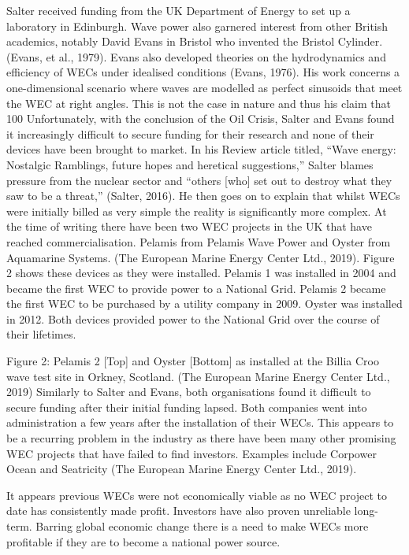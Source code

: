 \documentclass{report}
\begin{document}
Salter received funding from the UK Department of Energy to set up a laboratory in Edinburgh. Wave power also garnered interest from other British academics, notably David Evans in Bristol who invented the Bristol Cylinder. (Evans, et al., 1979).
Evans also developed theories on the hydrodynamics and efficiency of WECs under idealised conditions (Evans, 1976). His work concerns a one-dimensional scenario where waves are modelled as perfect sinusoids that meet the WEC at right angles. This is not the case in nature and thus his claim that 100%
Unfortunately, with the conclusion of the Oil Crisis, Salter and Evans found it increasingly difficult to secure funding for their research and none of their devices have been brought to market. In his Review article titled, “Wave energy: Nostalgic Ramblings, future hopes and heretical suggestions,” Salter blames pressure from the nuclear sector and “others [who] set out to destroy what they saw to be a threat,” (Salter, 2016). He then goes on to explain that whilst WECs were initially billed as very simple the reality is significantly more complex.
At the time of writing there have been two WEC projects in the UK that have reached commercialisation. Pelamis from Pelamis Wave Power and Oyster from Aquamarine Systems. (The European Marine Energy Center Ltd., 2019). Figure 2 shows these devices as they were installed. Pelamis 1 was installed in 2004 and became the first WEC to provide power to a National Grid. Pelamis 2 became the first WEC to be purchased by a utility company in 2009. Oyster was installed in 2012. Both devices provided power to the National Grid over the course of their lifetimes.

  
Figure 2: Pelamis 2 [Top] and Oyster [Bottom] as installed at the Billia Croo wave test site in Orkney, Scotland. (The European Marine Energy Center Ltd., 2019)
Similarly to Salter and Evans, both organisations found it difficult to secure funding after their initial funding lapsed. Both companies went into administration a few years after the installation of their WECs. This appears to be a recurring problem in the industry as there have been many other promising WEC projects that have failed to find investors. Examples include Corpower Ocean and Seatricity (The European Marine Energy Center Ltd., 2019).

It appears previous WECs were not economically viable as no WEC project to date has consistently made profit. Investors have also proven unreliable long-term. Barring global economic change there is a need to make WECs more profitable if they are to become a national power source.
\end{document}
